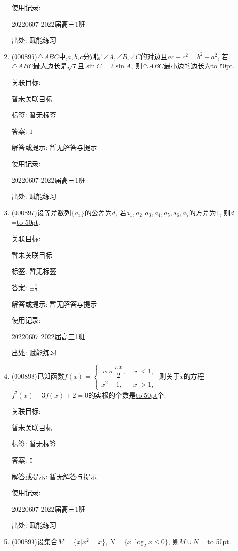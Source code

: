 \documentclass[10pt,a4paper]{article}
\newcommand{\blank}[1]{\underline{\hbox to #1pt{}}}
\begin{document}
\begin{enumerate}[1.]
使用记录:

20220607	2022届高三1班	


出处: 赋能练习
\item { (000896)}$\triangle ABC$中,$a,b,c$分别是$\angle A,\angle B,\angle C$的对边且$ac+c^2=b^2-a^2$, 若$\triangle ABC$最大边长是$\sqrt7$且$\sin C=2\sin A$, 则$\triangle ABC$最小边的边长为\blank{50}.


关联目标:

暂未关联目标



标签: 暂无标签

答案: $1$

解答或提示: 暂无解答与提示

使用记录:

20220607	2022届高三1班	


出处: 赋能练习
\item { (000897)}设等差数列$\{a_n\}$的公差为$d$, 若$a_1,a_2,a_3,a_4,a_5,a_6,a_7$的方差为$1$, 则$d$=\blank{50}.


关联目标:

暂未关联目标



标签: 暂无标签

答案: $\pm \frac 12$

解答或提示: 暂无解答与提示

使用记录:

20220607	2022届高三1班	


出处: 赋能练习
\item { (000898)}已知函数$f(x)=\begin{cases} \cos \dfrac{\pi x}2, & |x|\le 1,  \\ x^2-1, & |x|>1,  \end{cases}$ 则关于$x$的方程$f^2(x)-3f(x)+2=0$的实根的个数是\blank{50}个.


关联目标:

暂未关联目标



标签: 暂无标签

答案: $5$

解答或提示: 暂无解答与提示

使用记录:

20220607	2022届高三1班	


出处: 赋能练习
\item { (000899)}设集合$M=\{x|x^2=x\}$, $N=\{x|\log_2 x\le 0\}$, 则$M\cup N=$\blank{50}.



\end{enumerate}
\end{document}
